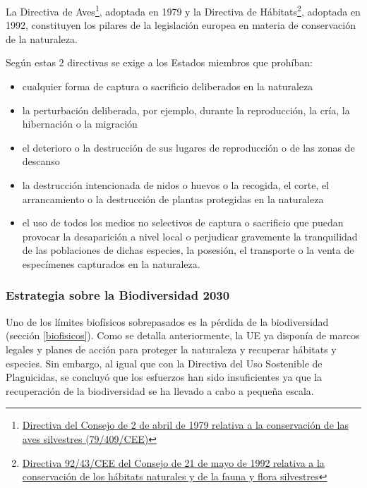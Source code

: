 \documentclass[a4paper, nobind]{templates/ociamthesis}
\providecommand{\tightlist}{%
  \setlength{\itemsep}{0pt}\setlength{\parskip}{0pt}}
\begin{document}
La Directiva de Aves\footnote{\href{https://eur-lex.europa.eu/legal-content/ES/TXT/?uri=CELEX\%3A01979L0409-20081223}{Directiva del Consejo de 2 de abril de 1979
  relativa a la conservación de las aves silvestres
  (79/409/CEE)}}, adoptada en 1979 y la
Directiva de Hábitats\footnote{\href{https://eur-lex.europa.eu/legal-content/ES/TXT/?uri=CELEX\%3A01992L0043-20130701}{Directiva 92/43/CEE del Consejo de 21 de mayo de
  1992 relativa a la conservación de los hábitats naturales y de la
  fauna y flora
  silvestres}}, adoptada en 1992, constituyen
los pilares de la legislación europea en materia de conservación de la
naturaleza.

Según estas 2 directivas se exige a los Estados miembros que prohíban:

\begin{itemize}
\tightlist
\item
  cualquier forma de captura o sacrificio deliberados en la naturaleza
\item
  la perturbación deliberada, por ejemplo, durante la reproducción, la
  cría, la hibernación o la migración
\item
  el deterioro o la destrucción de sus lugares de reproducción o de
  las zonas de descanso
\item
  la destrucción intencionada de nidos o huevos o la recogida, el
  corte, el arrancamiento o la destrucción de plantas protegidas en la
  naturaleza
\item
  el uso de todos los medios no selectivos de captura o sacrificio que
  puedan provocar la desaparición a nivel local o perjudicar
  gravemente la tranquilidad de las poblaciones de dichas especies, la
  posesión, el transporte o la venta de especímenes capturados en la
  naturaleza.
\end{itemize}

\hypertarget{estrategia-sobre-la-biodiversidad-2030}{%
\subsubsection{Estrategia sobre la Biodiversidad 2030}\label{estrategia-sobre-la-biodiversidad-2030}}

Uno de los límites biofísicos sobrepasados es la pérdida de la
biodiversidad (sección \ref{biofisicos}). Como se detalla
anteriormente, la UE ya disponía de marcos legales y planes de acción
para proteger la naturaleza y recuperar hábitats y especies. Sin
embargo, al igual que con la Directiva del Uso Sostenible de
Plaguicidas, se concluyó que los esfuerzos han sido insuficientes ya que
la recuperación de la biodiversidad se ha llevado a cabo a pequeña
escala.
\end{document}
